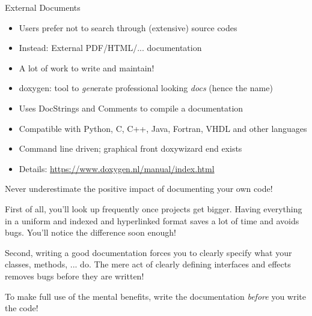 
\begin{frame}{External Documents}
%
\begin{itemize}
\item Users prefer not to search through (extensive) source codes
\item Instead: External PDF/HTML/... documentation
\item A lot of work to write and maintain!
\item doxygen: tool to \emph{gen}erate professional looking \emph{docs} (hence the name)
\item Uses DocStrings and Comments to compile a documentation
\item Compatible with Python, C, C++, Java, Fortran, VHDL and other languages
\item Command line driven; graphical front doxywizard end exists
\item Details: \url{https://www.doxygen.nl/manual/index.html}
\end{itemize}
%
\end{frame}


\begin{frame}
%
\begin{hintbox}
Never underestimate the positive impact of documenting your own code!

\vspace{4pt}
First of all, you'll look up frequently once projects get bigger. Having everything in a uniform and indexed and hyperlinked format saves a lot of time and avoids bugs. You'll notice the difference soon enough!

\vspace{4pt}
Second, writing a good documentation forces you to clearly specify what your classes, methods, ... do. The mere act of clearly defining interfaces and effects removes bugs before they are written!

\vspace{4pt}
To make full use of the mental benefits, write the documentation \emph{before} you write the code!
\end{hintbox}
%
\end{frame}


